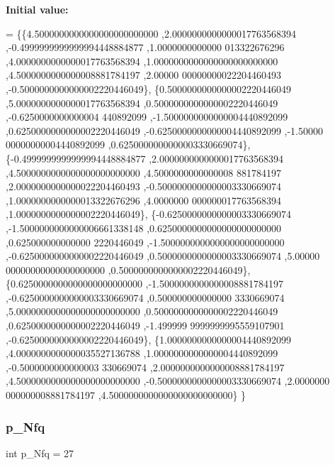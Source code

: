 {\bfseries Initial value\+:}
\begin{DoxyCode}
= \{\{4.5000000000000000000000000 ,2.0000000000000017763568394 ,-0.4999999999999994448884877 ,1.0000000000000
      013322676296 ,4.0000000000000017763568394 ,1.0000000000000000000000000 ,4.5000000000000008881784197 ,2.00000
      00000000022204460493 ,-0.5000000000000002220446049\},
\{0.5000000000000002220446049 ,5.0000000000000017763568394 ,0.5000000000000002220446049 ,-0.6250000000000004
      440892099 ,-1.5000000000000004440892099 ,0.6250000000000002220446049 ,-0.6250000000000004440892099 ,-1.50000
      00000000004440892099 ,0.6250000000000003330669074\},
\{-0.4999999999999994448884877 ,2.0000000000000017763568394 ,4.5000000000000000000000000 ,4.5000000000000008
      881784197 ,2.0000000000000022204460493 ,-0.5000000000000003330669074 ,1.0000000000000013322676296 ,4.0000000
      000000017763568394 ,1.0000000000000002220446049\},
\{-0.6250000000000003330669074 ,-1.5000000000000006661338148 ,0.6250000000000000000000000 ,0.625000000000000
      2220446049 ,-1.5000000000000000000000000 ,-0.6250000000000002220446049 ,0.5000000000000003330669074 ,5.00000
      00000000000000000000 ,0.5000000000000002220446049\},
\{0.6250000000000000000000000 ,-1.5000000000000008881784197 ,-0.6250000000000003330669074 ,0.500000000000000
      3330669074 ,5.0000000000000000000000000 ,0.5000000000000002220446049 ,0.6250000000000002220446049 ,-1.499999
      9999999995559107901 ,-0.6250000000000002220446049\},
\{1.0000000000000004440892099 ,4.0000000000000035527136788 ,1.0000000000000004440892099 ,-0.5000000000000003
      330669074 ,2.0000000000000008881784197 ,4.5000000000000000000000000 ,-0.5000000000000003330669074 ,2.0000000
      000000008881784197 ,4.5000000000000000000000000\}
\}
\end{DoxyCode}
\mbox{\label{a00990_aa030b0a9fe619a48647119bacea600e0}} 
\subsubsection{\texorpdfstring{p\+\_\+\+Nfq}{p\_Nfq}}
{\footnotesize\ttfamily int p\+\_\+\+Nfq = 27}

\mbox{\label{a00990_a207fd9268dfef5bf1505928a4f4c774a}} 
